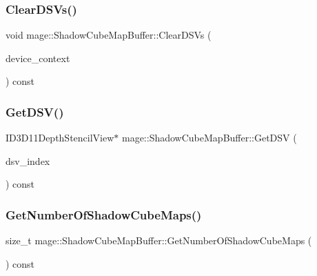 \hypertarget{structmage_1_1_shadow_cube_map_buffer_a302478177db8ed02a8fb610d308be9a1}{}\label{structmage_1_1_shadow_cube_map_buffer_a302478177db8ed02a8fb610d308be9a1} 
\subsubsection{\texorpdfstring{Clear\+D\+S\+Vs()}{ClearDSVs()}}
{\footnotesize\ttfamily void mage\+::\+Shadow\+Cube\+Map\+Buffer\+::\+Clear\+D\+S\+Vs (\begin{DoxyParamCaption}\item[{I\+D3\+D11\+Device\+Context2 $\ast$}]{device\+\_\+context }\end{DoxyParamCaption}) const\hspace{0.3cm}{\ttfamily [noexcept]}}

\hypertarget{structmage_1_1_shadow_cube_map_buffer_a1db641015a14c177b4c504b85905060a}{}\label{structmage_1_1_shadow_cube_map_buffer_a1db641015a14c177b4c504b85905060a} 
\subsubsection{\texorpdfstring{Get\+D\+S\+V()}{GetDSV()}}
{\footnotesize\ttfamily I\+D3\+D11\+Depth\+Stencil\+View$\ast$ mage\+::\+Shadow\+Cube\+Map\+Buffer\+::\+Get\+D\+SV (\begin{DoxyParamCaption}\item[{size\+\_\+t}]{dsv\+\_\+index }\end{DoxyParamCaption}) const\hspace{0.3cm}{\ttfamily [noexcept]}}

\hypertarget{structmage_1_1_shadow_cube_map_buffer_ab6832adb714a9685972ece7c410b38ad}{}\label{structmage_1_1_shadow_cube_map_buffer_ab6832adb714a9685972ece7c410b38ad} 
\subsubsection{\texorpdfstring{Get\+Number\+Of\+Shadow\+Cube\+Maps()}{GetNumberOfShadowCubeMaps()}}
{\footnotesize\ttfamily size\+\_\+t mage\+::\+Shadow\+Cube\+Map\+Buffer\+::\+Get\+Number\+Of\+Shadow\+Cube\+Maps (\begin{DoxyParamCaption}{ }\end{DoxyParamCaption}) const\hspace{0.3cm}{\ttfamily [noexcept]}}

